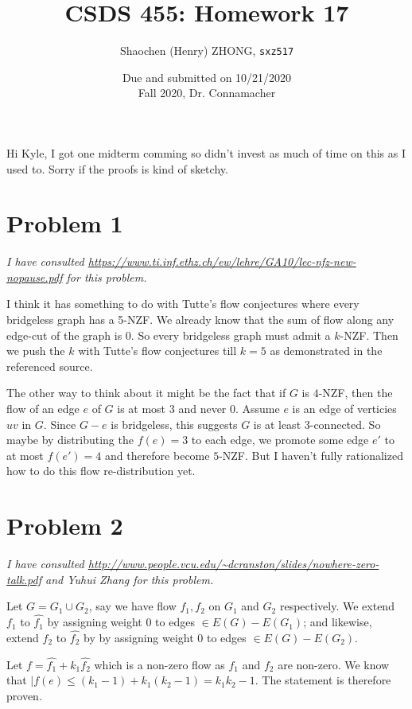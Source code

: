 \documentclass[11pt]{article}
\newcommand{\ilc}{\texttt}
\begin{document}
\title{\textbf{CSDS 455: Homework 17}}

\author{Shaochen (Henry) ZHONG, \ilc{sxz517}}
\date{Due and submitted on 10/21/2020 \\ Fall 2020, Dr. Connamacher}
\maketitle

Hi Kyle, I got one midterm comming so didn't invest as much of time on this as I used to. Sorry if the proofs is kind of sketchy.

\section*{Problem 1}

\textit{I have consulted \url{https://www.ti.inf.ethz.ch/ew/lehre/GA10/lec-nfz-new-nopause.pdf} for this problem.}\newline


I think it has something to do with Tutte's flow conjectures where every bridgeless graph has a 5-NZF. We already know that the sum of flow along any edge-cut of the graph is 0. So every bridgeless graph must admit a $k$-NZF. Then we push the $k$ with Tutte's flow conjectures till $k=5$ as demonstrated in the referenced source.\newline

\noindent The other way to think about it might be the fact that if $G$ is $4$-NZF, then the flow of an edge $e$ of $G$ is at most $3$ and never $0$. Assume $e$ is an edge of verticies $uv$ in $G$. Since $G-e$ is bridgeless, this suggests $G$ is at least 3-connected. So maybe by distributing the $f(e) = 3$ to each edge, we promote some edge $e'$ to at most $f(e') = 4$ and therefore become $5$-NZF. But I haven't fully rationalized how to do this flow re-distribution yet.


\section*{Problem 2}

\textit{I have consulted \url{http://www.people.vcu.edu/~dcranston/slides/nowhere-zero-talk.pdf} and Yuhui Zhang for this problem.}\newline

Let $G = G_1 \cup G_2$, say we have flow $f_1, f_2$ on $G_1$ and $G_2$ respectively. We extend $f_1$ to $\hat{f_1}$ by assigning weight $0$ to edges $\in E(G) - E(G_1)$; and likewise, extend $f_2$ to $\hat{f_2}$ by by assigning weight $0$ to edges $\in E(G) - E(G_2)$.

Let $f = \hat{f_1} + k_1 \hat{f_2}$ which is a non-zero flow as $f_1$ and $f_2$ are non-zero. We know that $|f(e) \leq (k_1 - 1) + k_1(k_2 -1) = k_1 k_2 -1$. The statement is therefore proven.
\end{document}
